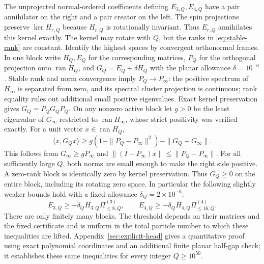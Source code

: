 \documentclass[11pt]{article}
\newcommand{\ran}{\operatorname{ran}}
\begin{document}
The unprojected normal-ordered coefficients defining $E_{3,Q},E_{4,Q}$
have a pair annihilator on the right and a pair creator on the left.
The spin projections preserve $\ker H_{r,Q}$ because $H_{r,Q}$ is
rotationally invariant. Thus $E_{r,Q}$ annihilates this kernel exactly.
The kernel may rotate with $Q$, but the ranks in
\eqref{eq:stable-rank} are constant. Identify the highest spaces by convergent
orthonormal frames. In one block write $H_Q,E_Q$ for the corresponding
matrices, $P_Q$ for the orthogonal projection onto $\ran H_Q$, and
$G_Q=E_Q+\delta H_Q$ with the planar allowance $\delta=10^{-6}$.
Stable rank and norm convergence imply $P_Q\to P_\infty$: the positive
spectrum of $H_\infty$ is separated from zero, and its spectral cluster
projection is continuous; rank equality rules out additional small positive
eigenvalues. Exact kernel preservation gives $G_Q=P_QG_QP_Q$.
On any nonzero active block let $g>0$ be the least eigenvalue of
$G_\infty$ restricted to $\ran H_\infty$, whose strict positivity was
verified exactly. For a unit vector $x\in\ran H_Q$,
\begin{equation}\label{eq:transfer-margin}
 \langle x,G_Qx\rangle
 \ge g\left(1-\|P_Q-P_\infty\|^2\right)
       -\|G_Q-G_\infty\|.
\end{equation}
This follows from $G_\infty\ge gP_\infty$ and
$\|(I-P_\infty)x\|\le\|P_Q-P_\infty\|$.
For all sufficiently large $Q$, both norms are small enough to make the
right side positive. A zero-rank block is identically zero by kernel
preservation. Thus $G_Q\ge0$ on the entire block, including its rotating
zero space.
In particular the following slightly weaker bounds hold with a fixed allowance
$\delta_Q=2\times10^{-6}$:
\begin{equation}\label{eq:sphere-head}
 E_{3,Q}\ge-\delta_QH_{3,Q}\Pi^{(3)}_{\le8,Q},\qquad
 E_{4,Q}\ge-\delta_QH_{4,Q}\Pi^{(4)}_{\le16,Q}.
\end{equation}
There are only finitely many blocks. The threshold depends on their
matrices and the fixed certificate and is uniform in the total particle number
to which these inequalities are lifted. Appendix~\ref{sec:explicit-head}
gives a quantitative proof using exact polynomial coordinates and an
additional finite planar half-gap check; it establishes these same
inequalities for every integer $Q\ge10^{50}$.
\end{document}
